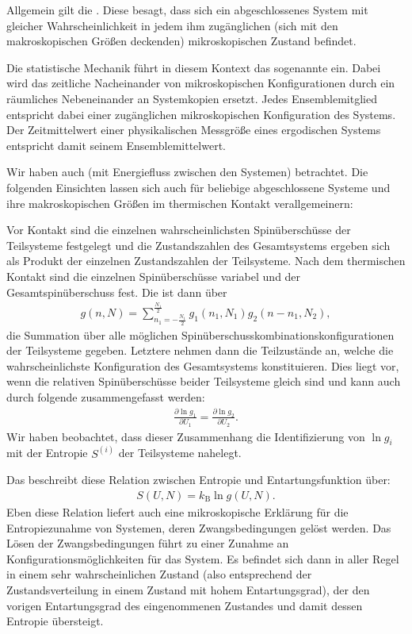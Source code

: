 \begin{summary}
    Allgemein gilt die . Diese besagt, dass sich ein abgeschlossenes System mit gleicher Wahrscheinlichkeit in jedem ihm zugänglichen (sich mit den makroskopischen Größen deckenden) mikroskopischen Zustand befindet.

    Die statistische Mechanik führt in diesem Kontext das sogenannte  ein. Dabei wird das zeitliche Nacheinander von mikroskopischen Konfigurationen durch ein räumliches Nebeneinander an Systemkopien ersetzt. Jedes Ensemblemitglied entspricht dabei einer zugänglichen mikroskopischen Konfiguration des Systems. Der Zeitmittelwert einer physikalischen Messgröße eines ergodischen Systems entspricht damit seinem Ensemblemittelwert.
   
    Wir haben auch  (mit Energiefluss zwischen den Systemen) betrachtet. Die folgenden Einsichten lassen sich auch für beliebige abgeschlossene Systeme und ihre makroskopischen Größen im thermischen Kontakt verallgemeinern:

    Vor Kontakt sind die einzelnen wahrscheinlichsten Spinüberschüsse der Teilsysteme festgelegt und die Zustandszahlen des Gesamtsystems ergeben sich als Produkt der einzelnen Zustandszahlen der Teilsysteme. Nach dem thermischen Kontakt sind die einzelnen Spinüberschüsse variabel und der Gesamtspinüberschuss fest. Die  ist dann über 
    \begin{align*}
        g(n,N) = \sum_{n_1=-\frac{N_1}{2}}^{\frac{N_1}{2}} g_1(n_1,N_1)g_2(n-n_1,N_2),
    \end{align*}
    die Summation über alle möglichen Spinüberschusskombinationskonfigurationen der Teilsysteme gegeben. 
    Letztere nehmen dann die Teilzustände an, welche die wahrscheinlichste Konfiguration des Gesamtsystems konstituieren. Dies liegt vor, wenn die relativen Spinüberschüsse beider Teilsysteme gleich sind und kann auch durch folgende  zusammengefasst werden:
    \begin{align}
        \frac{\partial \ln g_1}{\partial U_1}  = \frac{\partial \ln g_2}{\partial U_2}.
    \end{align}
    Wir haben beobachtet, dass dieser Zusammenhang die Identifizierung von $\ln g_i$ mit der Entropie $S^{(i)}$ der Teilsysteme nahelegt.
    
    Das  beschreibt diese Relation zwischen Entropie und Entartungsfunktion über: 
    \begin{align*}
        S(U,N)=k_\mathrm{B}\ln g(U,N).
    \end{align*}
    Eben diese Relation liefert auch eine mikroskopische Erklärung für die Entropiezunahme von Systemen, deren Zwangsbedingungen gelöst werden. Das Lösen der Zwangsbedingungen führt zu einer Zunahme an Konfigurationsmöglichkeiten für das System. Es befindet sich dann in aller Regel in einem sehr wahrscheinlichen Zustand (also entsprechend der Zustandsverteilung in einem Zustand mit hohem Entartungsgrad), der den vorigen Entartungsgrad des eingenommenen Zustandes und damit dessen Entropie übersteigt.


\end{summary}
